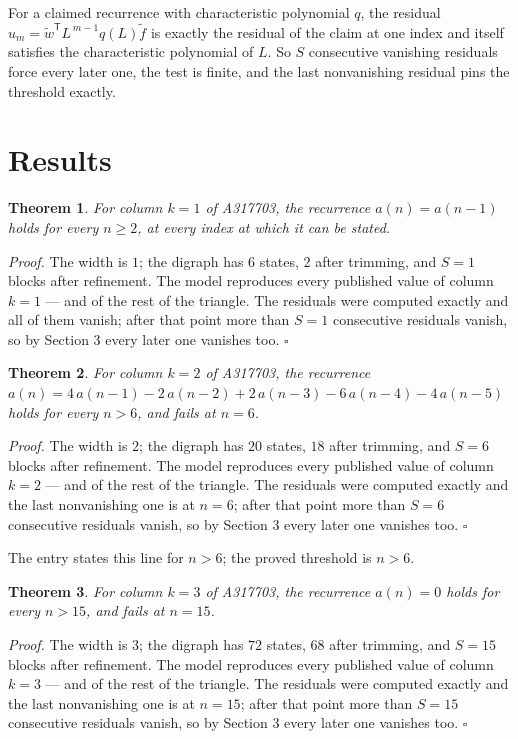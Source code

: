 \documentclass[11pt]{article}
\newtheorem{theorem}{Theorem}
\theoremstyle{definition}
\begin{document}
For a claimed recurrence with characteristic polynomial $q$, the residual $u_m = \tilde w^{\mathsf T}L^{\,m-1}q(L)\tilde f$ is exactly the residual of the claim at one index and itself satisfies the characteristic polynomial of $L$. So $S$ consecutive vanishing residuals force every later one, the test is finite, and the last nonvanishing residual pins the threshold exactly.

\section{Results}

\begin{theorem} For column $k = 1$ of A317703, the recurrence $a(n) = a(n-1)$ holds for every $n \ge 2$, at every index at which it can be stated.\end{theorem}

{\itshape Proof.} The width is $1$; the digraph has $6$ states, $2$ after trimming, and $S = 1$ blocks after refinement. The model reproduces every published value of column $k = 1$ --- and of the rest of the triangle. The residuals were computed exactly and all of them vanish; after that point more than $S = 1$ consecutive residuals vanish, so by Section 3 every later one vanishes too. $\square$

\begin{theorem} For column $k = 2$ of A317703, the recurrence $a(n) = 4\,a(n-1) - 2\,a(n-2) + 2\,a(n-3) - 6\,a(n-4) - 4\,a(n-5)$ holds for every $n > 6$, and fails at $n = 6$.\end{theorem}

{\itshape Proof.} The width is $2$; the digraph has $20$ states, $18$ after trimming, and $S = 6$ blocks after refinement. The model reproduces every published value of column $k = 2$ --- and of the rest of the triangle. The residuals were computed exactly and the last nonvanishing one is at $n = 6$; after that point more than $S = 6$ consecutive residuals vanish, so by Section 3 every later one vanishes too. $\square$

The entry states this line for $n > 6$; the proved threshold is $n > 6$.

\begin{theorem} For column $k = 3$ of A317703, the recurrence $a(n) = 0$ holds for every $n > 15$, and fails at $n = 15$.\end{theorem}

{\itshape Proof.} The width is $3$; the digraph has $72$ states, $68$ after trimming, and $S = 15$ blocks after refinement. The model reproduces every published value of column $k = 3$ --- and of the rest of the triangle. The residuals were computed exactly and the last nonvanishing one is at $n = 15$; after that point more than $S = 15$ consecutive residuals vanish, so by Section 3 every later one vanishes too. $\square$
\end{document}
